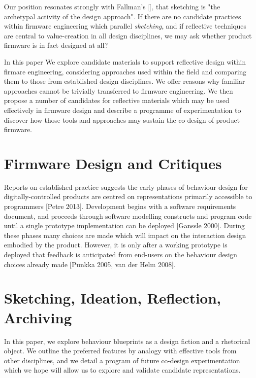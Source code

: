 \documentclass{chi-ext}
\begin{document}
{Our position resonates strongly with Fallman's [], that sketching is "the archetypal activity of the design approach". If there are no candidate practices within firmware engineering which parallel \emph{sketching}, and if reflective techniques are central to value-creation in all design disciplines, we may ask whether product firmware is in fact designed at all?

In this paper We explore candidate materials to support reflective design within firmare engineering, considering approaches used within the field and comparing them to those from established design disciplines. We offer reasons why familiar approaches cannot be trivially transferred to firmware engineering. We then propose a number of candidates for reflective materials which may be used effectively in firmware design and describe a programme of experimentation to discover how those tools and approaches may sustain the co-design of product firmware.

\section{Firmware Design and Critiques}

Reports on established practice suggests the early phases of behaviour design for digitally-controlled products are centred on representations primarily accessible to programmers [Petre 2013]. Development begins with a software requirements document, and proceeds through software modelling constructs and program code until a single prototype implementation can be deployed [Ganssle 2000]. During these phases many choices are made which will impact on the interaction design embodied by the product. However, it is only after a working prototype is deployed that feedback is anticipated from end-users on the behaviour design choices already made [Punkka 2005, van der Helm 2008].


\section{Sketching, Ideation, Reflection, Archiving  }

In this paper, we explore behaviour blueprints as a design fiction and a rhetorical object. We outline the preferred features by analogy with effective tools from other disciplines, and we detail a program of future co-design experimentation which we hope will allow us to explore and validate candidate representations.

}
\end{document}
